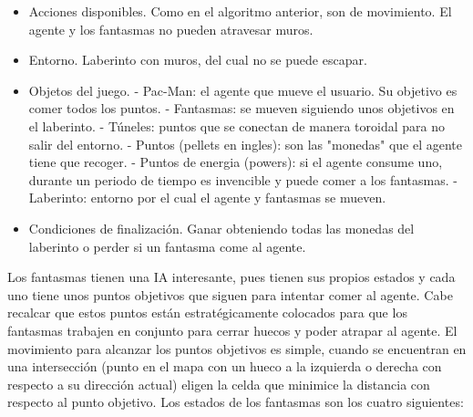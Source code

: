 		\begin{itemize}		
			\item Acciones disponibles. Como en el algoritmo anterior, son de movimiento. El agente y los fantasmas no pueden atravesar muros.
			\vspace*{-0.2cm}
			\item Entorno. Laberinto con muros, del cual no se puede escapar.
			\item Objetos del juego. 
			\vspace*{-0.3cm}
				\subitem - Pac-Man: el agente que mueve el usuario. Su objetivo es comer todos los puntos.
				\vspace{-1cm}
				\subitem - Fantasmas: se mueven siguiendo unos objetivos en el laberinto.
				\vspace{-0.2cm}
				\subitem - Túneles: puntos que se conectan de manera toroidal para no salir del entorno.
				\vspace{-0.2cm}
				\subitem - Puntos (pellets en ingles): son las "monedas" que el agente tiene que recoger.
				\vspace{-0.2cm}
				\subitem - Puntos de energia (powers): si el agente consume uno, durante un periodo de \hspace*{1.25cm} tiempo es invencible y puede comer a los fantasmas.				
				\vspace{-0.2cm}
				\subitem - Laberinto: entorno por el cual el agente y fantasmas se mueven.
			\vspace*{-0.3cm}
			\item Condiciones de finalización. Ganar obteniendo todas las monedas del laberinto o perder si un fantasma come al agente. 			
		\end{itemize}
		
		
		Los fantasmas tienen una IA interesante, pues tienen sus propios estados y cada uno tiene unos puntos objetivos que siguen para intentar comer al agente. Cabe recalcar que estos puntos están estratégicamente colocados para que los fantasmas trabajen en conjunto para cerrar huecos y poder atrapar al agente. El movimiento para alcanzar los puntos objetivos es simple, cuando se encuentran en una intersección (punto en el mapa con un hueco a la izquierda o derecha con respecto a su dirección actual) eligen la celda que minimice la distancia con respecto al punto objetivo. Los estados de los fantasmas son los cuatro siguientes:
		
